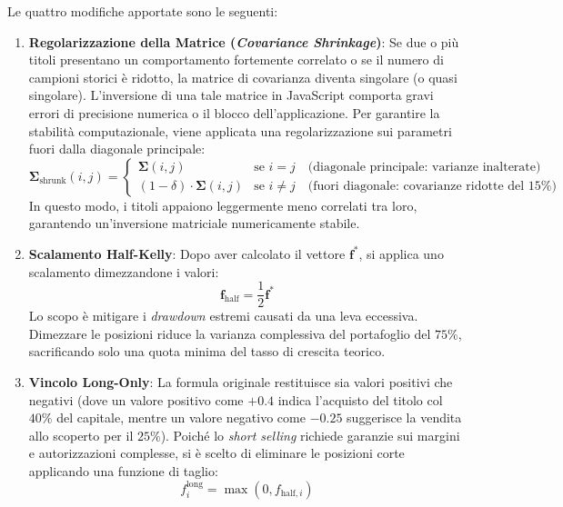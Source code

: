 Le quattro modifiche apportate sono le seguenti:

\begin{enumerate}
    \item \textbf{Regolarizzazione della Matrice (\textit{Covariance Shrinkage})}: Se due o più titoli presentano un comportamento fortemente correlato o se il numero di campioni storici è ridotto, la matrice di covarianza diventa singolare (o quasi singolare). L'inversione di una tale matrice in JavaScript comporta gravi errori di precisione numerica o il blocco dell'applicazione. Per garantire la stabilità computazionale, viene applicata una regolarizzazione sui parametri fuori dalla diagonale principale:
    \begin{equation}
        \mathbf{\Sigma}_{\text{shrunk}}(i, j) = 
        \begin{cases} 
            \mathbf{\Sigma}(i, j) & \text{se } i = j \quad \text{(diagonale principale: varianze inalterate)} \\ 
            (1 - \delta) \cdot \mathbf{\Sigma}(i, j) & \text{se } i \neq j \quad \text{(fuori diagonale: covarianze ridotte del } 15\% \text{)}
        \end{cases}
    \end{equation}
    In questo modo, i titoli appaiono leggermente meno correlati tra loro, garantendo un'inversione matriciale numericamente stabile.

    \item \textbf{Scalamento Half-Kelly}: Dopo aver calcolato il vettore $\mathbf{f}^*$, si applica uno scalamento dimezzandone i valori:
    \begin{equation}
        \mathbf{f}_{\text{half}} = \frac{1}{2} \mathbf{f}^*
    \end{equation}
    Lo scopo è mitigare i \textit{drawdown} estremi causati da una leva eccessiva. Dimezzare le posizioni riduce la varianza complessiva del portafoglio del $75\%$, sacrificando solo una quota minima del tasso di crescita teorico.

    \item \textbf{Vincolo Long-Only}: La formula originale restituisce sia valori positivi che negativi (dove un valore positivo come $+0.4$ indica l'acquisto del titolo col $40\%$ del capitale, mentre un valore negativo come $-0.25$ suggerisce la vendita allo scoperto per il $25\%$). Poiché lo \textit{short selling} richiede garanzie sui margini e autorizzazioni complesse, si è scelto di eliminare le posizioni corte applicando una funzione di taglio:
    \begin{equation}
        f_i^{\text{long}} = \max\left(0, f_{\text{half}, i}\right)
    \end{equation}


\end{enumerate}
